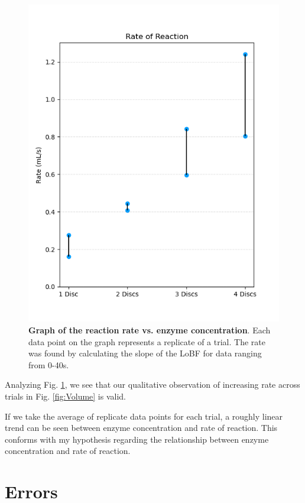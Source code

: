 \documentclass[prl,twocolumn,amsmath,amssymb,superscriptaddress]{revtex4-2}
\begin{document}
\begin{figure}[htb]
    \includegraphics[width=1\linewidth]{Rate.png}
    \caption{\textbf{Graph of the reaction rate vs. enzyme concentration}. Each data point on the graph represents a replicate of a trial. The rate was found by calculating the slope of the LoBF for data ranging from 0-40s.}
    \label{fig:Rate}
\end{figure}

\newpage
Analyzing Fig. \ref{fig:Rate}, we see that our qualitative observation of increasing rate across trials in Fig. \ref{fig:Volume} is valid.

If we  take the average of replicate data points for each trial, a roughly linear trend can be seen between enzyme concentration and rate of reaction. This conforms with my hypothesis regarding the relationship between enzyme concentration and rate of reaction.

\newpage
\section{Errors}
\end{document}

